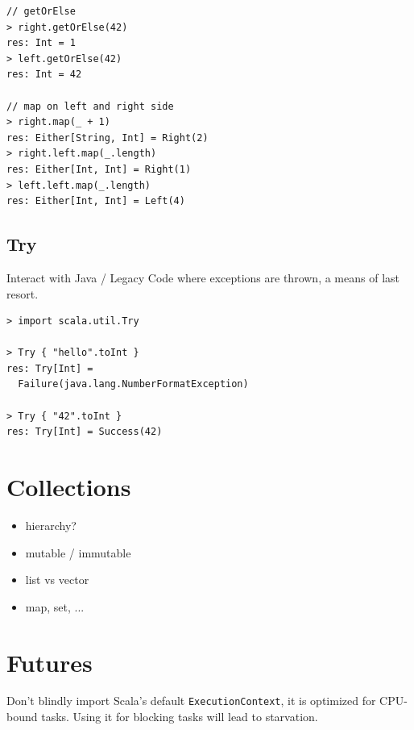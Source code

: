 \documentclass[10pt,landscape,a4paper]{article}
\newcommand{\TODO}[2][]{\todo[inline,color=green!40,linecolor=green!50,#1]{\small TODO #2}}
\begin{document}
\begin{multicols*}{4}
\begin{verbatim}
// getOrElse
> right.getOrElse(42)
res: Int = 1
> left.getOrElse(42)
res: Int = 42

// map on left and right side
> right.map(_ + 1)
res: Either[String, Int] = Right(2)
> right.left.map(_.length)
res: Either[Int, Int] = Right(1)
> left.left.map(_.length)
res: Either[Int, Int] = Left(4)
\end{verbatim}
  \subsection{Try}
  \begin{mdframed}
    Interact with Java / Legacy Code where exceptions are thrown, a
    means of last resort.
  \end{mdframed}
  \begin{center}
  \end{center}
\begin{verbatim}
> import scala.util.Try

> Try { "hello".toInt }
res: Try[Int] =
  Failure(java.lang.NumberFormatException)

> Try { "42".toInt }
res: Try[Int] = Success(42)
\end{verbatim}

  \section{Collections}
  \TODO{}

  \begin{itemize}
  \item hierarchy?
  \item mutable / immutable
  \item list vs vector
  \item map, set, ...
  \end{itemize}

  \section{Futures}

  \begin{mdframed}
    Don't blindly import Scala's default \texttt{ExecutionContext}, it
    is optimized for CPU-bound tasks.  Using it for blocking tasks
    will lead to starvation.
  \end{mdframed}


\end{multicols*}
\end{document}
